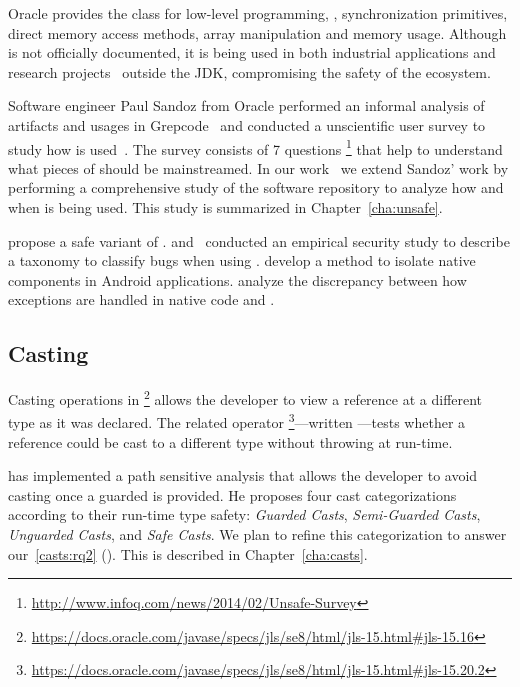 Oracle provides the \smu{} class for low-level programming,
\eg{}, synchronization primitives, direct memory access methods,
array manipulation and memory usage.
Although \smu{} is not officially documented,
it is being used in both industrial applications
and research projects~\citep{korlandNoninvasiveConcurrencyJava2010,pukallFlexibleDynamicSoftware,gligoricCoDeSeFastDeserialization2011}
outside the JDK, compromising the safety of the \java{} ecosystem.

Software engineer Paul Sandoz from Oracle performed an informal analysis of
\mavencentral{} artifacts and usages in Grepcode~\citep{sandoz-personal-communication}
and conducted a unscientific user survey to study how \unsafe{} is used~\citep{psandoz14}.
The survey consists of 7 questions%
\footnote{\url{http://www.infoq.com/news/2014/02/Unsafe-Survey}} 
that help to understand what pieces of \smu{} should be mainstreamed.
In our work~\citep{mastrangeloUseYourOwn2015} we extend Sandoz' work
by performing a comprehensive study of the \mavencentral{}
software repository to analyze how and when \smu{} is being used.
This study is summarized in Chapter~\ref{cha:unsafe}.

\cite{tanSafeJavaNative2006} propose a safe variant of \jni{}.
\cite{tanEmpiricalSecurityStudy2008} and~\cite{kondohFindingBugsJava2008}
conducted an empirical security study to describe a taxonomy to classify bugs when using \jni{}.
\cite{sunNativeGuardProtectingAndroid2014} develop a method to isolate native components in Android applications.
\cite{liFindingBugsExceptional2009} analyze the discrepancy between how exceptions are handled in native code and \java{}.

\subsection{Casting}\label{sec:literature-review:casting}

Casting operations in \java{}%
\footnote{\url{https://docs.oracle.com/javase/specs/jls/se8/html/jls-15.html\#jls-15.16}}
allows the developer to view a reference at a different type as it was declared.
The related  operator%
\footnote{\url{https://docs.oracle.com/javase/specs/jls/se8/html/jls-15.html\#jls-15.20.2}}---written ---tests whether a reference  could be cast to a different type  without
throwing  at run-time.

\cite{wintherGuardedTypePromotion2011} has implemented a
path sensitive analysis that allows the developer to avoid casting
once a guarded  is provided.
He proposes four cast categorizations according to their
run-time type safety:
\emph{Guarded Casts}, \emph{Semi-Guarded Casts},
\emph{Unguarded Casts}, and \emph{Safe Casts}.
We plan to refine this categorization to answer
our~\ref{casts:rq2} (\emph{\crqB}).
This is described in Chapter~\ref{cha:casts}.

